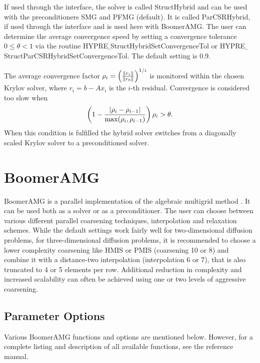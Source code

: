If used through the  interface, the solver is called StructHybrid
and can be used with the preconditioners SMG and PFMG (default).
It is called ParCSRHybrid, if used through the  interface and is used here
with BoomerAMG.
The user can determine the average convergence speed by setting a convergence tolerance $0 \leq \theta
< 1$
via the routine HYPRE$\_$StructHybridSetConvergenceTol or HYPRE$\_$StructParCSRHybridSetConvergenceTol.
The default setting is 0.9.

The average convergence factor $\rho_i = \left({{\| r_i \|} \over {\| r_0 \|}}\right)^{1/i}$ is
monitored within the chosen Krylov solver, where $r_i = b - Ax_{i}$ is the $i$-th residual.
Convergence is considered too slow when
\begin{equation}
\left( 1 - {{|\rho_i - \rho_{i-1}|} \over { \max(\rho_i, \rho_{i-1})}} \right) \rho_i > \theta .
\end{equation}
When this condition is fulfilled the hybrid solver switches from a diagonally scaled 
Krylov solver to a preconditioned solver.


\section{BoomerAMG}

BoomerAMG is a parallel implementation of the algebraic multigrid 
method \cite{Ruge_Stueben_1987}. 
It can be used
both as a solver or as a preconditioner.  The user can choose between various
different parallel coarsening techniques, interpolation and relaxation schemes.
While the default settings work fairly well for two-dimensional diffusion problems, for three-dimensional diffusion problems, it is recommended to choose a lower complexity coarsening like HMIS or PMIS (coarsening 10 or 8) and combine it with a distance-two interpolation (interpolation 6 or 7), that is also truncated to 4 or 5 elements per row. Additional reduction in complexity and increased scalability can often be achieved using one or two levels of aggressive coarsening.

\subsection{Parameter Options}

Various BoomerAMG functions and options are mentioned below. However, for a complete
listing and description of all available functions, see the reference manual.


